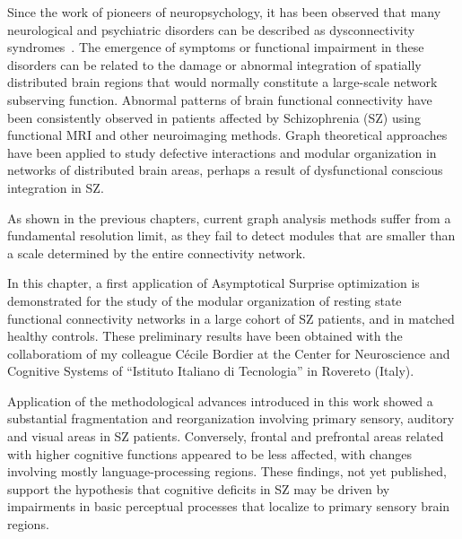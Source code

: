 Since the work of pioneers of neuropsychology, it has been observed that many neurological and psychiatric disorders can be described as dysconnectivity syndromes~\cite{catani2005}.
The emergence of symptoms or functional impairment in these disorders can be related to the damage or abnormal integration of spatially distributed brain regions that would normally constitute a large-scale network subserving function.
Abnormal patterns of brain functional connectivity have been consistently observed in patients affected by Schizophrenia (SZ) using functional MRI and other neuroimaging methods.
Graph theoretical approaches have been applied to study defective interactions and modular organization in networks of distributed brain areas, perhaps a result of dysfunctional conscious integration in SZ.

As shown in the previous chapters, current graph analysis methods suffer from a fundamental resolution limit, as they fail to detect modules that are smaller than a scale determined by the entire connectivity network.

In this chapter, a first application of Asymptotical Surprise optimization is demonstrated for the study of the modular organization of resting state functional connectivity networks in a large cohort of SZ patients, and in matched healthy controls.
These preliminary results have been obtained with the collaboratiom of my colleague Cécile Bordier at the Center for Neuroscience and Cognitive Systems of ``Istituto Italiano di Tecnologia'' in Rovereto (Italy).

Application of the methodological advances introduced in this work showed a substantial fragmentation and reorganization involving primary sensory, auditory and visual areas in SZ patients. Conversely, frontal and prefrontal areas related with higher cognitive functions appeared to be less affected, with changes involving mostly language-processing regions.
These findings, not yet published, support the hypothesis that cognitive deficits in SZ may be driven by impairments in basic perceptual processes that localize to primary sensory brain regions.


